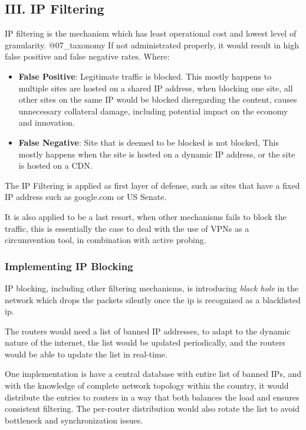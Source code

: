 \hypertarget{iii.-ip-filtering}{%
\subsection{III. IP Filtering}\label{iii.-ip-filtering}}

IP filtering is the mechanism which has least operational cost and
lowest level of granularity. @07\_taxonomy If not administrated
properly, it would result in high false positive and false negative
rates. Where:

\begin{itemize}
\tightlist
\item
  \textbf{False Positive}: Legitimate traffic is blocked. This mostly
  happens to multiple sites are hosted on a shared IP address, when
  blocking one site, all other sites on the same IP would be blocked
  disregarding the content, causes unnecessary collateral damage,
  including potential impact on the economy and innovation.
\item
  \textbf{False Negative}: Site that is deemed to be blocked is not
  blocked, This mostly happens when the site is hosted on a dynamic IP
  address, or the site is hosted on a CDN.
\end{itemize}

The IP Filtering is applied as first layer of defense, such as sites
that have a fixed IP address such as google.com or US Senate.

It is also applied to be a last resort, when other mechanisms fails to
block the traffic, this is essentially the case to deal with the use of
VPNs as a circumvention tool, in combination with active probing.

\hypertarget{implementing-ip-blocking}{%
\subsubsection{Implementing IP
Blocking}\label{implementing-ip-blocking}}

IP blocking, including other filtering mechanisms, is introducing
\emph{black hole} in the network which drops the packets silently once
the ip is recognized as a blacklisted ip.

The routers would need a list of banned IP addresses, to adapt to the
dynamic nature of the internet, the list would be updated periodically,
and the routers would be able to update the list in real-time.

One implementation is have a central database with entire list of banned
IPs, and with the knowledge of complete network topology within the
country, it would distribute the entries to routers in a way that both
balances the load and ensures consistent filtering. The per-router
distribution would also rotate the list to avoid bottleneck and
synchronization issues.

